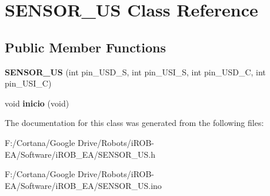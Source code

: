 \hypertarget{class_s_e_n_s_o_r___u_s}{}\section{S\+E\+N\+S\+O\+R\+\_\+\+US Class Reference}
\label{class_s_e_n_s_o_r___u_s}
\subsection*{Public Member Functions}
\begin{DoxyCompactItemize}
\item 
{\bfseries S\+E\+N\+S\+O\+R\+\_\+\+US} (int pin\+\_\+\+U\+S\+D\+\_\+S, int pin\+\_\+\+U\+S\+I\+\_\+S, int pin\+\_\+\+U\+S\+D\+\_\+C, int pin\+\_\+\+U\+S\+I\+\_\+C)\hypertarget{class_s_e_n_s_o_r___u_s_abd3cc56e7e01b991a0032e53631c3131}{}\label{class_s_e_n_s_o_r___u_s_abd3cc56e7e01b991a0032e53631c3131}

\item 
void {\bfseries inicio} (void)\hypertarget{class_s_e_n_s_o_r___u_s_af548b6b7f424b8aef79f06fc118d0a47}{}\label{class_s_e_n_s_o_r___u_s_af548b6b7f424b8aef79f06fc118d0a47}

\end{DoxyCompactItemize}


The documentation for this class was generated from the following files\+:\begin{DoxyCompactItemize}
\item 
F\+:/\+Cortana/\+Google Drive/\+Robots/i\+R\+O\+B-\/\+E\+A/\+Software/i\+R\+O\+B\+\_\+\+E\+A/S\+E\+N\+S\+O\+R\+\_\+\+U\+S.\+h\item 
F\+:/\+Cortana/\+Google Drive/\+Robots/i\+R\+O\+B-\/\+E\+A/\+Software/i\+R\+O\+B\+\_\+\+E\+A/S\+E\+N\+S\+O\+R\+\_\+\+U\+S.\+ino\end{DoxyCompactItemize}

